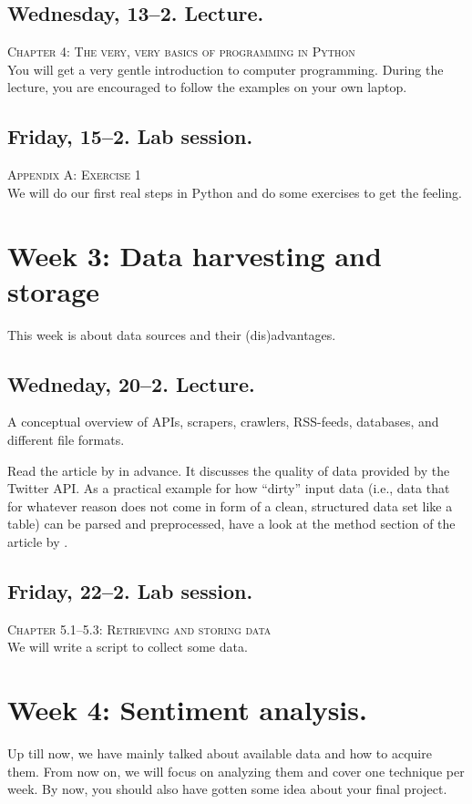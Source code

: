 \documentclass[a4paper,10pt]{report}
\begin{document}
\subsection*{Wednesday, 13--2. Lecture.}
\textsc{ Chapter 4: The very, very basics of programming in Python}\\
You will get a very gentle introduction to computer programming. During the lecture, you are encouraged to follow the examples on your own laptop.


\subsection*{Friday, 15--2. Lab session.}
\textsc{ Appendix A: Exercise 1}\\
We will do our first real steps in Python and do some exercises to get the feeling. 


\section*{Week 3: Data harvesting and storage}
This week is about data sources and their (dis)advantages. 

\subsection*{Wedneday, 20--2. Lecture.}
A conceptual overview of APIs, scrapers, crawlers, RSS-feeds, databases, and different file formats.

Read the article by \cite{Morstatter2013} in advance. It discusses the quality of data provided by the Twitter API. As a practical example for how ``dirty'' input data (i.e., data that for whatever reason does not come in form of a clean, structured data set like a table) can be parsed and preprocessed, have a look at the method section of the article by \cite{Lewis2013}. 


\subsection*{Friday, 22--2. Lab session.}
\textsc{ Chapter 5.1--5.3: Retrieving and storing data}\\
We will write a script to collect some data. 




\section*{Week 4: Sentiment analysis.}
Up till now, we have mainly talked about available data and how to acquire them. From now on, we will focus on analyzing them and cover one technique per week. By now, you should also have gotten some idea about your final project.
\end{document}

